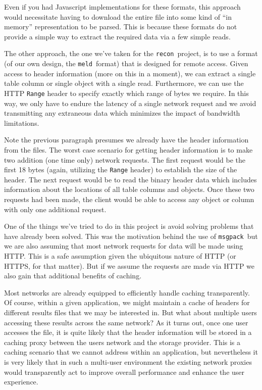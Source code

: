 \documentclass[11pt,a4paper,onecolumn]{article}
\newcommand{\recon}{\texttt{recon}}
\newcommand{\meld}{\texttt{meld}}
\newcommand{\msgpack}{\texttt{msgpack}}
\newcommand{\code}[1]{\texttt{#1}} %
\begin{document}
Even if you had Javascript implementations for these formats, this
approach would necessitate having to download the entire file into
some kind of ``in memory'' representation to be parsed.  This is
because these formats do not provide a simple way to extract the
required data via a few simple reads.

The other approach, the one we've taken for the \recon\ project, is to
use a format (of our own design, the \meld\ format) that is designed
for remote access.  Given access to header information (more on this
in a moment), we can extract a single table column or single object
with a single read.  Furthermore, we can use the HTTP \code{Range}
header to specify exactly which range of bytes we require.  In this
way, we only have to endure the latency of a single network request
and we avoid transmitting any extraneous data which minimizes the
impact of bandwidth limitations.


Note the previous paragraph presumes we already have the header
information from the files.  The worst case scenario for getting
header information is to make two addition (one time only) network
requests.  The first request would be the first 18 bytes (again,
utilizing the \code{Range} header) to establish the size of the
header.  The next request would be to read the binary header data
which includes information about the locations of all table columns
and objects.  Once these two requests had been made, the client would
be able to access any object or column with only one additional
request.


One of the things we've tried to do in this project is avoid solving
problems that have already been solved.  This was the motivation
behind the use of \msgpack\ but we are also assuming that most network
requests for data will be made using HTTP.  This is a safe assumption
given the ubiquitous nature of HTTP (or HTTPS, for that matter).  But
if we assume the requests are made via HTTP we also gain that
additional benefits of caching.

Most networks are already equipped to efficiently handle caching
transparently.  Of course, within a given application, we might
maintain a cache of headers for different results files that we may be
interested in.  But what about multiple users accessing these results
across the same network?  As it turns out, once one user accesses the
file, it is quite likely that the header information will be stored in
a caching proxy between the users network and the storage provider.
This is a caching scenario that we cannot address within an
application, but nevertheless it is very likely that in such a
multi-user environment the existing network proxies would
transparently act to improve overall performance and enhance the user
experience.
\end{document}
